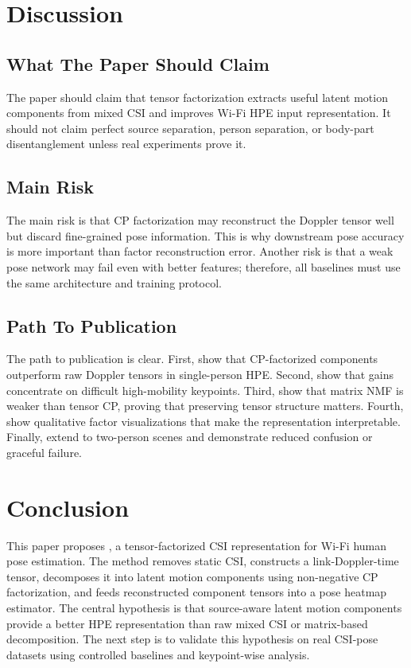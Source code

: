 \documentclass[10pt,journal]{IEEEtran}
\newcommand{\method}{\mathtt{DePose\mbox{-}Fi}}
\begin{document}
\section{Discussion}

\subsection{What The Paper Should Claim}

The paper should claim that tensor factorization extracts useful latent motion components from mixed CSI and improves Wi-Fi HPE input representation. It should not claim perfect source separation, person separation, or body-part disentanglement unless real experiments prove it.

\subsection{Main Risk}

The main risk is that CP factorization may reconstruct the Doppler tensor well but discard fine-grained pose information. This is why downstream pose accuracy is more important than factor reconstruction error. Another risk is that a weak pose network may fail even with better features; therefore, all baselines must use the same architecture and training protocol.

\subsection{Path To Publication}

The path to publication is clear. First, show that CP-factorized components outperform raw Doppler tensors in single-person HPE. Second, show that gains concentrate on difficult high-mobility keypoints. Third, show that matrix NMF is weaker than tensor CP, proving that preserving tensor structure matters. Fourth, show qualitative factor visualizations that make the representation interpretable. Finally, extend to two-person scenes and demonstrate reduced confusion or graceful failure.

\section{Conclusion}

This paper proposes \method, a tensor-factorized CSI representation for Wi-Fi human pose estimation. The method removes static CSI, constructs a link-Doppler-time tensor, decomposes it into latent motion components using non-negative CP factorization, and feeds reconstructed component tensors into a pose heatmap estimator. The central hypothesis is that source-aware latent motion components provide a better HPE representation than raw mixed CSI or matrix-based decomposition. The next step is to validate this hypothesis on real CSI-pose datasets using controlled baselines and keypoint-wise analysis.
\end{document}
